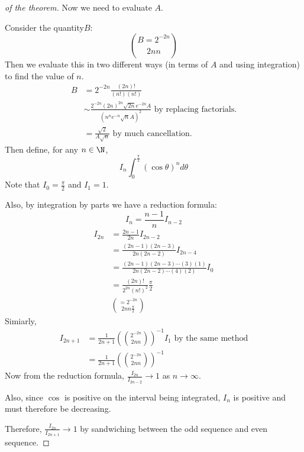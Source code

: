 \documentclass[../Main.tex]{subfiles}
\begin{document}
\begin{proof}[of the theorem]
    \par
    Now we need to evaluate $A$.\par
    Consider the quantity$B$:
    \begin{equation*}
        B = 2^{-2n} \choose{2n}{n}
    \end{equation*}
    Then we evaluate this in two different ways (in terms of $A$ and using integration) to find the value of $n$.
    \begin{align*}
        B &= 2^{-2n} \frac{(2n)!}{(n!)(n!)} \\
        &\sim \frac{2^{-2n} (2n)^{2n} \sqrt{2n} e^{-2n} A}{(n^n e^{-n} \sqrt{n} A)^2} \text{ by replacing factorials.} \\
        &= \frac{\sqrt{2}}{A \sqrt{n}} \text{ by much cancellation.}
    \end{align*}
    Then define, for any $n \in \N$,
    \begin{equation*}
        I_n \int_0^{\frac{\pi}{2}} (\cos{\theta})^n d\theta
    \end{equation*}
    Note that $I_0 = \frac{\pi}{2}$ and $I_1 = 1$.\par
    Also, by integration by parts we have a reduction formula:
    \begin{equation*}
        I_n = \frac{n-1}{n} I_{n-2}
    \end{equation*}
    \begin{align*}
        I_{2n} &= \frac{2n - 1}{2n} I_{2n-2} \\
        &= \frac{(2n-1)(2n-3)}{2n(2n-2)} I_{2n-4} \\
        &= \frac{(2n-1)(2n-3) \cdots(3)(1)}{2n(2n-2) \cdots (4)(2)} I_0 \\
        &= \frac{(2n)!}{2^{2n}(n!)^2} \frac{\pi}{2} \\
        &= 2^{-2n} \choose{2n}{n} \frac{\pi}{2}
    \end{align*}
    Simiarly,
    \begin{align*}
        I_{2n+1} &= \frac{1}{2n+1}\left(2^{-2n} \choose{2n}{n}\right)^{-1} I_1 \text{ by the same method} \\
        &= \frac{1}{2n+1}\left(2^{-2n} \choose{2n}{n}\right)^{-1}
    \end{align*}
    Now from the reduction formula, $\frac{I_{2n}}{I_{2n-2}} \to 1$ as $n \to \infty$.\par
    Also, since $\cos$ is positive on the interval being integrated, $I_n$ is positive and must therefore be decreasing.\par
    Therefore, $\frac{I_{2n}}{I_{2n+1}} \to 1$ by sandwiching between the odd sequence and even sequence.\par

\end{proof}
\end{document}
